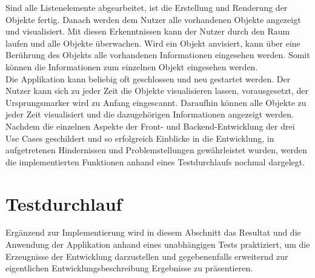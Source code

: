 Sind alle Listenelemente abgearbeitet, ist die Erstellung und Renderung der Objekte fertig. Danach werden dem Nutzer alle vorhandenen Objekte angezeigt und 
visualisiert. Mit diesen Erkenntnissen kann der Nutzer durch den Raum laufen und alle Objekte überwachen. Wird ein Objekt anvisiert, kann über eine Berührung 
des Objekts alle vorhandenen Informationen eingesehen werden. Somit können die Informationen zum einzelnen Objekt eingesehen werden. 
\\ 
Die Applikation kann beliebig oft geschlossen und neu gestartet werden. Der Nutzer kann sich zu jeder Zeit die Objekte visualisieren lassen, vorausgesetzt, der 
Ursprungsmarker wird zu Anfang eingescannt. Daraufhin können alle Objekte zu jeder Zeit visualisiert und die dazugehörigen Informationen angezeigt werden.
\\ 
\linebreak
Nachdem die einzelnen Aspekte der Front- und Backend-Entwicklung der drei Use Cases geschildert und so erfolgreich Einblicke in die Entwicklung, in 
aufgetretenen Hindernissen und Problemstellungen gewährleistet wurden, werden die implementierten Funktionen anhand eines Testdurchlaufs nochmal dargelegt.
\section{Testdurchlauf} %
\label{chap:testdurchlauf}
Ergänzend zur Implementierung wird in diesem Abschnitt das Resultat und die Anwendung der Applikation anhand eines unabhängigen Tests praktiziert, um die 
Erzeugnisse der Entwicklung darzustellen und gegebenenfalls erweiternd zur eigentlichen Entwicklungsbeschreibung Ergebnisse zu präsentieren.